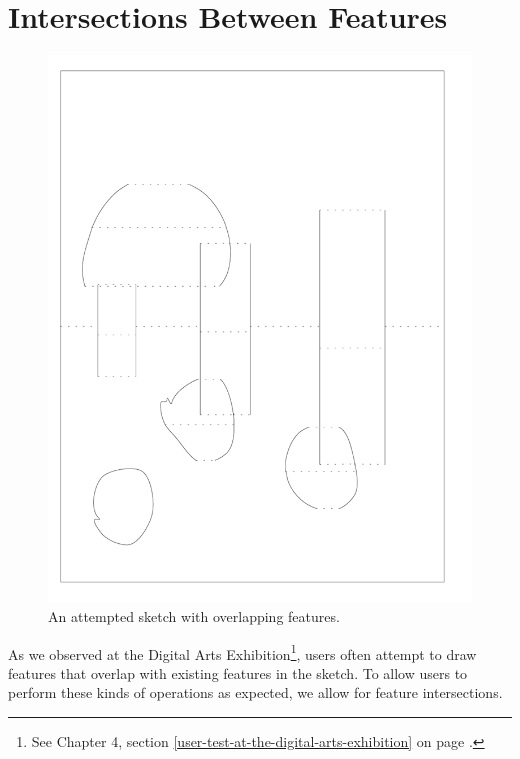 \section{Intersections Between
Features}\label{intersections-between-features}

\begin{figure}[htbp]
\centering
\includegraphics{figures/91_Appendix_DAX_Creations/overlapping_features.png}
\caption{An attempted sketch with overlapping features.}
\end{figure}

As we observed at the Digital Arts Exhibition\footnote{See Chapter 4,
  section \ref{user-test-at-the-digital-arts-exhibition} on page
  \pageref{user-test-at-the-digital-arts-exhibition}.}, users often
attempt to draw features that overlap with existing features in the
sketch. To allow users to perform these kinds of operations as expected,
we allow for feature intersections.

